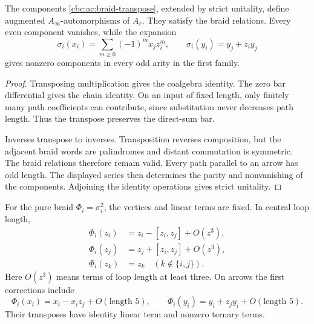 \begin{proposition}\label{cbc:ac:braid-higher}
The components \eqref{cbc:ac:braid-transpose},
extended by strict unitality, define augmented
$A_\infty$-automorphisms of $A_r$. They satisfy
the braid relations. Every even component
vanishes, while the expansion
\[
 \sigma_i(x_i)=\sum_{m\geq0}(-1)^m x_jz_i^m,\qquad
 \sigma_i(y_i)=y_j+z_i y_j
\]
gives nonzero components in every odd arity
in the first family.
\end{proposition}
\begin{proof}
Transposing multiplication gives the coalgebra
identity. The zero bar differential gives the
chain identity. On an input of fixed length,
only finitely many path coefficients can
contribute, since substitution never decreases
path length. Thus the transpose preserves
the direct-sum bar.

Inverses transpose to inverses. Transposition
reverses composition, but the adjacent braid
words are palindromes and distant commutation
is symmetric. The braid relations therefore
remain valid. Every path parallel to an
arrow has odd length. The displayed series
then determines the parity and nonvanishing
of the components. Adjoining the identity
operations gives strict unitality.
\end{proof}

For the pure braid $\Phi_i=\sigma_i^2$, the
vertices and linear terms are fixed. In
central loop length,
\begin{equation}\label{cbc:ac:pure-loops}
 \begin{aligned}
  \Phi_i(z_i)&=z_i-[z_i,z_j]+O(z^3),\\
  \Phi_i(z_j)&=z_j+[z_i,z_j]+O(z^3),\\
  \Phi_i(z_k)&=z_k\quad(k\notin\{i,j\}).
 \end{aligned}
\end{equation}
Here $O(z^3)$ means terms of loop length at
least three. On arrows the first corrections
include
\[
 \Phi_i(x_i)=x_i-x_i z_j+O(\text{length }5),\qquad
 \Phi_i(y_i)=y_i+z_j y_i+O(\text{length }5).
\]
Their transposes have identity linear term
and nonzero ternary terms.


